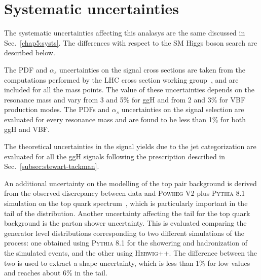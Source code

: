 \section{Systematic uncertainties}\label{chap6:Systematics}

The systematic uncertainties affecting this analasys are the same discussed in Sec.~\ref{chap5:systs}. The differences with respect to the SM Higgs boson search are described below.

The PDF and $\alpha_s$ uncertainties on the signal cross sections are taken from the computations performed by the LHC cross section working group~\cite{YRtmp}, and are included for all the mass points. The value of these uncertainties depends on the resonance mass and vary from 3 and 5\% for ggH and from 2 and 3\% for VBF production modes. The PDFs and $\alpha_{s}$ uncertainties on the signal selection are evaluated for every resonance mass and are found to be less than 1\% for both ggH and VBF.

The theoretical uncertainties in the signal yields due to the jet categorization are evaluated for all the ggH signals following the prescription described in Sec.~\ref{subsec:stewart-tackman}.

An additional uncertainty on the modelling of the top pair background is derived from the observed discrepancy between data and \textsc{Powheg V2} plus \textsc{Pythia 8.1} simulation on the top quark \pt spectrum~\cite{Khachatryan:2015oqa}, which is particularly important in the tail of the \mti distribution. Another uncertainty affecting the \mti tail for the top quark background is the parton shower uncertainty. This is evaluated comparing the generator level \mti distributions corresponding to two different simulations of the \ttbar process: one obtained using \textsc{Pythia 8.1} for the showering and hadronization of the simulated events, and the other using \textsc{Herwig++}. The difference between the two is used to extract a shape uncertainty, which is less than 1\% for low \mti values and reaches about 6\% in the \mti tail.






